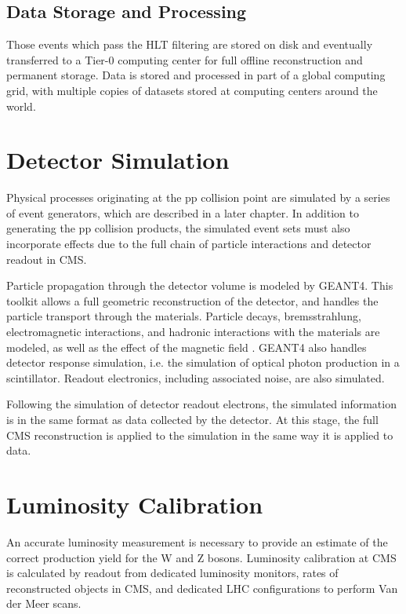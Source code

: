 \subsection{Data Storage and Processing}
Those events which pass the HLT filtering are stored on disk and eventually transferred to a Tier-0 computing center for full offline reconstruction and permanent storage. Data is stored and processed in part of a global computing grid, with multiple copies of datasets stored at computing centers around the world. 
\section{Detector Simulation}
Physical processes originating at the pp collision point are simulated by a series of event generators, which are described in a later chapter. In addition to generating the pp collision products, the simulated event sets must also incorporate effects due to the full chain of particle interactions and detector readout in CMS.

Particle propagation through the detector volume is modeled by GEANT4\cite{AGOSTINELLI2003250}. This toolkit allows a full geometric reconstruction of the detector, and handles the particle transport through the materials. Particle decays, bremsstrahlung, electromagnetic interactions, and hadronic interactions with the materials are modeled, as well as the effect of the magnetic field \cite{ALLISON2016186}. GEANT4 also handles detector response simulation, i.e. the simulation of optical photon production in a scintillator. Readout electronics, including associated noise, are also simulated.

Following the simulation of detector readout electrons, the simulated information is in the same format as data collected by the detector. At this stage, the full CMS reconstruction is applied to the simulation in the same way it is applied to data. 

\section{Luminosity Calibration}\label{ch:cms:lumi}
An accurate luminosity measurement is necessary to provide an estimate of the correct production yield for the W and Z bosons. Luminosity calibration at CMS is calculated by readout from dedicated luminosity monitors, rates of reconstructed objects in CMS, and dedicated LHC configurations to perform Van der Meer scans.

